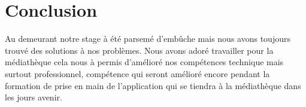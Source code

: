 \documentclass[12pt,a4paper]{article}
\begin{document}
\section{Conclusion}
Au demeurant notre stage à été parsemé d’embûche mais nous avons
toujours trouvé des solutions à nos problèmes. Nous avons adoré travailler pour
la médiathèque cela nous à permis d'amélioré nos compétences technique mais surtout professionnel,
compétence qui seront amélioré encore pendant la formation de prise en main de l'application qui se
tiendra à la médiathèque dans les jours avenir.
\end{document}
